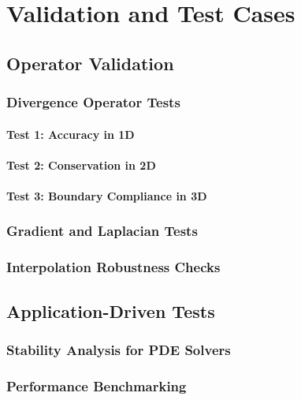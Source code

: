 \part{Validation and Test Cases}

\chapter{Operator Validation}

\section{Divergence Operator Tests}

\subsection{Test 1: Accuracy in 1D}

\subsection{Test 2: Conservation in 2D}

\subsection{Test 3: Boundary Compliance in 3D}

\section{Gradient and Laplacian Tests}

\section{Interpolation Robustness Checks}

\chapter{Application-Driven Tests}

\section{Stability Analysis for PDE Solvers}

\section{Performance Benchmarking}

